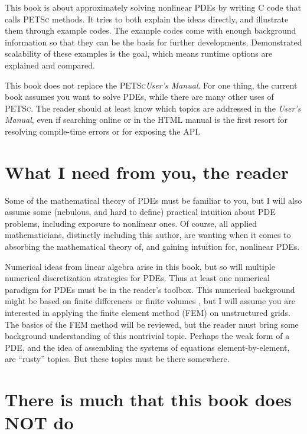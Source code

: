 \documentclass{tufte-book}
\newcommand{\PETSc}{\textsc{PETSc}\xspace}
\begin{document}
This book is about approximately solving nonlinear PDEs by writing C code that calls \PETSc methods.  It tries to both explain the ideas directly, and illustrate them through example codes.  The example codes come with enough background information so that they can be the basis for further developments.  Demonstrated scalability of these examples is the goal, which means runtime options are explained and compared.

This book does not replace the \PETSc \emph{User's Manual}.  For one thing, the current book assumes you want to solve PDEs, while there are many other uses of \PETSc.  The reader should at least know which topics are addressed in the \emph{User's Manual}, even if searching online or in the HTML manual is the first resort for resolving compile-time errors or for exposing the API.

\section{What I need from you, the reader}

Some of the mathematical theory of PDEs must be familiar to you, but I will also assume some (nebulous, and hard to define) practical intuition about PDE problems, including exposure to nonlinear ones.  Of course, all applied mathematicians, distinctly including this author, are wanting when it comes to absorbing the mathematical theory of, and gaining intuition for, nonlinear PDEs.

Numerical ideas from linear algebra \citep{TrefethenBau} arise in this book, but so will multiple numerical discretization strategies for PDEs.  Thus at least one numerical paradigm for PDEs must be in the reader's toolbox.  This numerical background might be based on finite differences \citep{MortonMayers} or finite volumes \citep{LeVeque}, but I will assume you are interested in applying the finite element method (FEM) on unstructured grids.  The basics of the FEM method will be reviewed, but the reader must bring some background understanding of this nontrivial topic.  Perhaps the weak form of a PDE, and the idea of assembling the systems of equations element-by-element, are ``rusty'' topics.  But these topics must be there somewhere.

\section{There is much that this book does NOT do}
\end{document}
